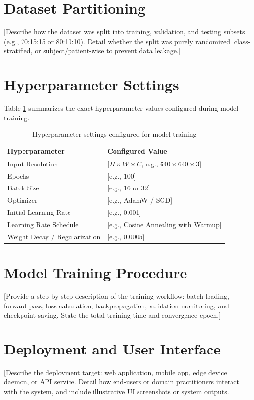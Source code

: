 \section{Dataset Partitioning}
[Describe how the dataset was split into training, validation, and testing subsets (e.g., 70:15:15 or 80:10:10). Detail whether the split was purely randomized, class-stratified, or subject/patient-wise to prevent data leakage.]

\section{Hyperparameter Settings}
Table \ref{tab:hyperparameters} summarizes the exact hyperparameter values configured during model training:

\begin{table}[htbp]
\centering
\caption{Hyperparameter settings configured for model training}
\label{tab:hyperparameters}
\vspace{0.2cm}
\begin{tabular}{|l|l|}
\hline
\textbf{Hyperparameter} & \textbf{Configured Value} \\
\hline
Input Resolution & [$H \times W \times C$, e.g., $640 \times 640 \times 3$] \\
\hline
Epochs & [e.g., 100] \\
\hline
Batch Size & [e.g., 16 or 32] \\
\hline
Optimizer & [e.g., AdamW / SGD] \\
\hline
Initial Learning Rate & [e.g., 0.001] \\
\hline
Learning Rate Schedule & [e.g., Cosine Annealing with Warmup] \\
\hline
Weight Decay / Regularization & [e.g., 0.0005] \\
\hline
\end{tabular}
\end{table}

\section{Model Training Procedure}
[Provide a step-by-step description of the training workflow: batch loading, forward pass, loss calculation, backpropagation, validation monitoring, and checkpoint saving. State the total training time and convergence epoch.]

\section{Deployment and User Interface}
[Describe the deployment target: web application, mobile app, edge device daemon, or API service. Detail how end-users or domain practitioners interact with the system, and include illustrative UI screenshots or system outputs.]
